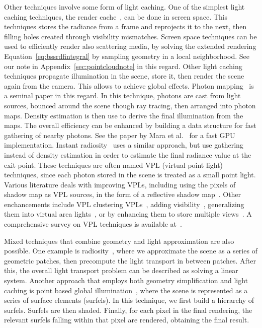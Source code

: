 Other techniques involve some form of light caching. One of the simplest light caching techniques, the render cache~\cite{Walter2002}, can be done in screen space. This techniques stores the radiance from a frame and reprojects it to the next, then filling holes created through visibility mismatches. Screen space techniques can be used to efficiently render also scattering media, by solving the extended rendering Equation~\ref{eq:bssrdfintegral} by sampling geometry in a local neighborhood. See our note in Appendix~\ref{sec:pointcloudnote} in this regard. Other light caching techniques propagate illumination in the scene, store it, then render the scene again from the camera. This allows to achieve global effects. Photon mapping~\cite{Jensen1996} is a seminal paper in this regard. In this technique, photons are cast from light sources, bounced around the scene though ray tracing, then arranged into photon maps. Density estimation is then use to derive the final illumination from the maps. The overall efficiency can be enhanced by building a data structure for fast gathering of nearby photons. See the paper by Mara et al.~\cite{Mara2013} for a fast GPU implementation. Instant radiosity~\cite{Keller1997} uses a similar approach, but use gathering instead of density estimation in order to estimate the final radiance value at the exit point. These techniques are often named VPL (virtual point light) techniques, since each photon stored in the scene is treated as a small point light. Various literature deals with improving VPLs, including using the pixels of shadow map as VPL sources, in the form of a reflective shadow map~\cite{Dachsbacher2005}. Other enchancements include VPL clustering VPLs~\cite{Walter2005, Bus2015}, adding visibility~\cite{Ritschel2008}, generalizing them into virtual area lights~\cite{Dong09}, or by enhancing them to store multiple views~\cite{Simon2015}. A comprehensive survey on VPL techniques is available at~\cite{Dachsbacher2014}.

Mixed techniques that combine geometry and light approximation are also possible. One example is radiosity~\cite{Goral1984}, where we approximate the scene as a series of geometric patches, then precompute the light transport in between patches. After this, the overall light transport problem can be described as solving a linear system. Another approach that employs both geometry simplification and light caching is point based global illumination~\cite{Christensen2008}, where the scene is represented as a series of surface elements (surfels). In this technique, we first build a hierarchy of surfels. Surfels are then shaded. Finally, for each pixel in the final rendering, the relevant surfels falling within that pixel are rendered, obtaining the final result. 

